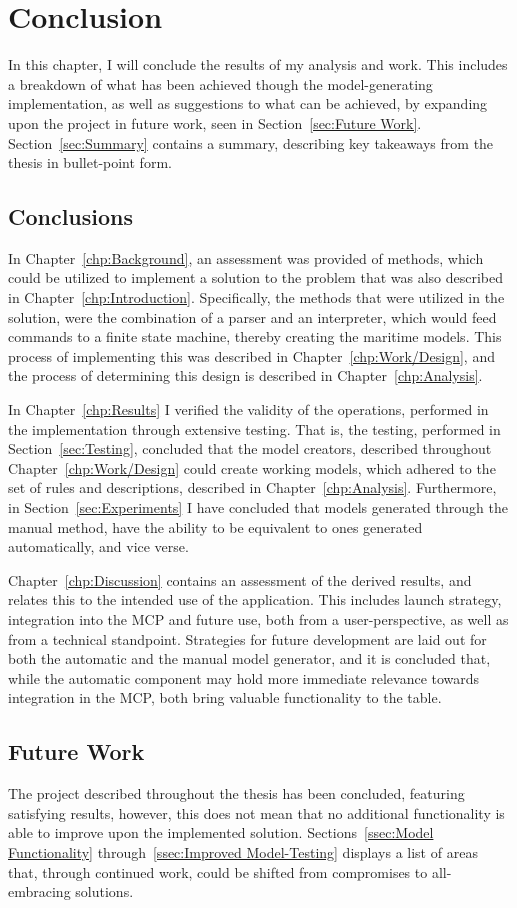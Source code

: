 \chapter{Conclusion}
In this chapter, I will conclude the results of my analysis and work. This includes a breakdown of what has been achieved though the model-generating implementation, as well as suggestions to what can be achieved, by expanding upon the project in future work, seen in Section~\ref{sec:Future Work}. Section~\ref{sec:Summary} contains a summary, describing key takeaways from the thesis in bullet-point form.
\section{Conclusions}
In Chapter~\ref{chp:Background}, an assessment was provided of methods, which could be utilized to implement a solution to the problem that was also described in Chapter~\ref{chp:Introduction}. Specifically, the methods that were utilized in the solution, were the combination of a parser and an interpreter, which would feed commands to a finite state machine, thereby creating the maritime models. This process of implementing this was described in Chapter~\ref{chp:Work/Design}, and the process of determining this design is described in Chapter~\ref{chp:Analysis}.

In Chapter~\ref{chp:Results} I verified the validity of the operations, performed in the implementation through extensive testing. That is, the testing, performed in Section~\ref{sec:Testing}, concluded that the model creators, described throughout Chapter~\ref{chp:Work/Design} could create working models, which adhered to the set of rules and descriptions, described in Chapter~\ref{chp:Analysis}. Furthermore, in Section~\ref{sec:Experiments} I have concluded that models generated through the manual method, have the ability to be equivalent to ones generated automatically, and vice verse.

Chapter~\ref{chp:Discussion} contains an assessment of the derived results, and relates this to the intended use of the application. This includes launch strategy, integration into the MCP and future use, both from a user-perspective, as well as from a technical standpoint. Strategies for future development are laid out for both the automatic and the manual model generator, and it is concluded that, while the automatic component may hold more immediate relevance towards integration in the MCP, both bring valuable functionality to the table.
\section{Future Work}
The project described throughout the thesis has been concluded, featuring satisfying results, however, this does not mean that no additional functionality is able to improve upon the implemented solution. Sections~\ref{ssec:Model Functionality} through~\ref{ssec:Improved Model-Testing} displays a list of areas that, through continued work, could be shifted from compromises to all-embracing solutions.

